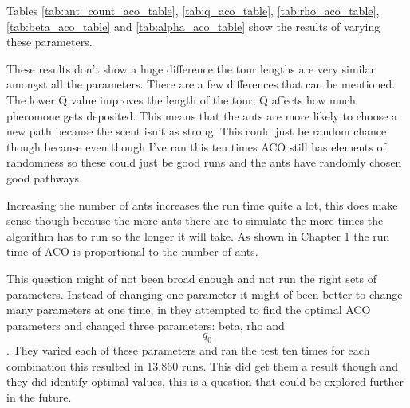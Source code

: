 Tables \ref{tab:ant_count_aco_table}, \ref{tab:q_aco_table}, \ref{tab:rho_aco_table}, \ref{tab:beta_aco_table} and \ref{tab:alpha_aco_table} show the results of varying these parameters. 

These results don't show a huge difference the tour lengths are very similar amongst all the parameters. There are a few differences that can be mentioned. The lower Q value improves the length of the tour, Q affects how much pheromone gets deposited. This means that the ants are more likely to choose a new path because the scent isn't as strong. This could just be random chance though because even though I've ran this ten times ACO still has elements of randomness so these could just be good runs and the ants have randomly chosen good pathways.

Increasing the number of ants increases the run time quite a lot, this does make sense though because the more ants there are to simulate the more times the algorithm has to run so the longer it will take. As shown in Chapter 1 the run time of ACO is proportional to the number of ants.

This question might of not been broad enough and not run the right sets of parameters. Instead of changing one parameter it might of been better to change many parameters at one time, in \cite{gaertner_clark} they attempted to find the optimal ACO parameters and changed three parameters: beta, rho and \[q_{0}\]. They varied each of these parameters and ran the test ten times for each combination this resulted in 13,860 runs. This did get them a result though and they did identify optimal values, this is a question that could be explored further in the future. 